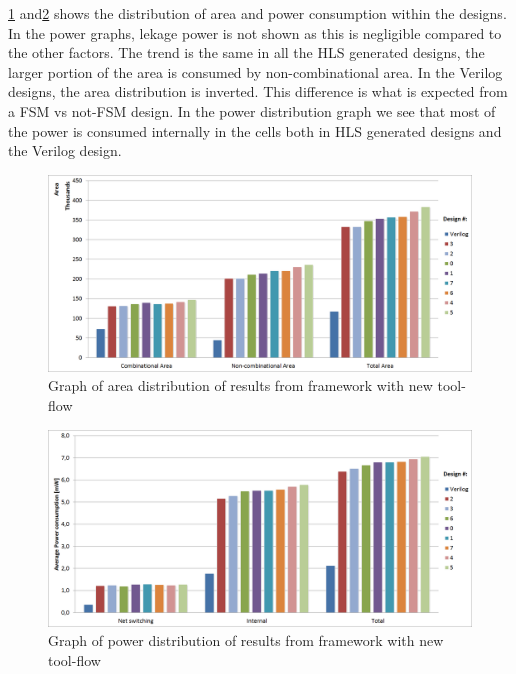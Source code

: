 \cref{fig:resultgraphareaframeworkrun2} and\cref{fig:resultgraphpowerframeworkrun2} shows the distribution of area and power consumption within the designs. In the power graphs, lekage power is not shown as this is negligible compared to the other factors. The trend is the same in all the HLS generated designs, the larger portion of the area is consumed by non-combinational area. In the Verilog designs, the area distribution is inverted. This difference is what is expected from a FSM vs not-FSM design. In the power distribution graph we see that most of the power is consumed internally in the cells both in HLS generated designs and the Verilog design.

\begin{figure}[hbpt]
\centering
\includegraphics[width=\textwidth]{../figs/resultGraphAreaDistribution.png}
\caption{\label{fig:resultgraphareaframeworkrun2}Graph of area distribution of results from framework with new tool-flow}
\end{figure}

\begin{figure}[hbpt]
\centering
\includegraphics[width=\textwidth]{../figs/resultGraphPowerDistribution.png}
\caption{\label{fig:resultgraphpowerframeworkrun2}Graph of power distribution of results from framework with new tool-flow}
\end{figure}

